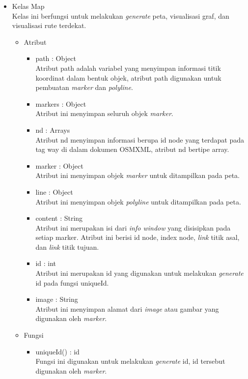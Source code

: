 \begin{itemize}
  \item Kelas Map\\
  Kelas ini berfungsi untuk melakukan \textit{generate} peta, visualisasi graf,
  dan visualisasi rute terdekat.
  \begin{itemize}
    \item Atribut
    \begin{itemize}
      \item path : Object\\
      Atribut path adalah variabel yang menyimpan informasi titik koordinat
      dalam bentuk objek, atribut path digunakan untuk pembuatan \textit{marker}
      dan \textit{polyline}.
      
      \item markers : Object\\
      Atribut ini menyimpan seluruh objek \textit{marker}.
      
      \item nd : Arrays\\
      Atribut nd menyimpan informasi berupa id node yang terdapat pada tag way
      di dalam dokumen OSMXML, atribut nd bertipe array.
      
      \item marker : Object\\
      Atribut ini menyimpan objek \textit{marker} untuk ditampilkan pada peta.
      
      \item line : Object\\
      Atribut ini menyimpan objek \textit{polyline} untuk ditampilkan pada peta.
      
      \item content : String\\
      Atribut ini merupakan isi dari \textit{info window} yang disisipkan pada
      setiap marker. Atribut ini berisi id node, index node, \textit{link} titik
      asal, dan \textit{link} titik tujuan.
      
      \item id : int\\
      Atribut ini merupakan id yang digunakan untuk melakukan \textit{generate}
      id pada fungsi uniqueId. 
      
      \item image : String\\
      Atribut ini menyimpan alamat dari \textit{image} atau gambar yang
      digunakan oleh \textit{marker}.
    \end{itemize}
  \end{itemize}
  \begin{itemize}
    \item Fungsi
    \begin{itemize}
      \item uniqueId() : id\\
      Fungsi ini digunakan untuk melakukan \textit{generate} id, id tersebut
      digunakan oleh \textit{marker}.
      

\end{itemize}
\end{itemize}
\end{itemize}
